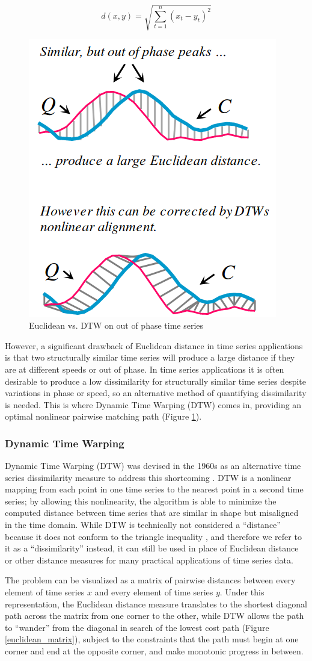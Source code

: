 \documentclass[12pt, letterpaper]{article}
\begin{document}
\begin{equation} \label{euclid}
d(x, y) = \sqrt{\sum_{t=1}^{n}(x_t-y_t)^2}
\end{equation}

\begin{figure}
  \centering
  \includegraphics[height=0.25\textwidth]{img/peaks.png}
  \caption{Euclidean vs. DTW on out of phase time series \cite{rakthanmanon_addressing_2013}}
  \label{peaks}
\end{figure}

However, a significant drawback of Euclidean distance in time series
applications is that two structurally similar time series will produce a large
distance if they are at different speeds or out of phase. In time series
applications it is often desirable to produce a low dissimilarity for
structurally similar time series despite variations in phase or speed, so an
alternative method of quantifying dissimilarity is needed. This is where Dynamic
Time Warping (DTW) comes in, providing an optimal nonlinear pairwise matching
path (Figure \ref{peaks}).


\subsubsection{Dynamic Time Warping}

Dynamic Time Warping (DTW) was devised in the 1960s as an alternative time
series dissimilarity measure to address this shortcoming
\cite{sakoe_dynamic_1978}. DTW is a nonlinear mapping from each point in one
time series to the nearest point in a second time series; by allowing this
nonlinearity, the algorithm is able to minimize the computed distance
between time series that are similar in shape but misaligned in the time domain.
While DTW is technically not considered a ``distance'' because it does not
conform to the triangle inequality \cite{jain_semi-metrification_2018}, and
therefore we refer to it as a ``dissimilarity'' instead, it can still be used in
place of Euclidean distance or other distance measures for many practical
applications of time series data.

The problem can be visualized as a matrix of pairwise distances between every
element of time series $x$ and every element of time series $y$. Under this
representation, the Euclidean distance measure translates to the shortest
diagonal path across the matrix from one corner to the other, while DTW allows
the path to ``wander'' from the diagonal in search of the lowest cost path
(Figure \ref{euclidean_matrix}), subject to the constraints that the path must
begin at one corner and end at the opposite corner, and make monotonic progress
in between.
\end{document}

